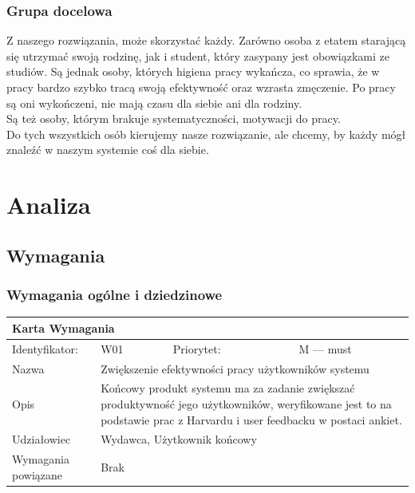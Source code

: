 \documentclass[a4paper,11pt]{report}
\begin{document}
\subsection {Grupa docelowa}
Z naszego rozwiązania, może skorzystać każdy.
Zarówno osoba z etatem starającą się utrzymać swoją rodzinę, jak i student, który zasypany jest obowiązkami ze studiów.
Są jednak osoby, których higiena pracy wykańcza, co sprawia, że w pracy bardzo szybko tracą swoją efektywność oraz wzrasta zmęczenie.
Po pracy są oni wykończeni, nie mają czasu dla siebie ani dla rodziny.\\
Są też osoby, którym brakuje systematyczności, motywacji do pracy.\\
Do tych wszystkich osób kierujemy nasze rozwiązanie, ale chcemy, by każdy mógł znaleźć w naszym systemie coś dla siebie.\\
\chapter {Analiza}
\section {Wymagania}
\subsection {Wymagania ogólne i dziedzinowe}
		\begin{tabular}{|p{3cm}|p{2cm}|p{2cm}|p{6cm}|}
		\hline
		\multicolumn{4}{|p{12 cm}|}{Karta Wymagania}\\
		\hline
		Identyfikator: & W01 & Priorytet: & M — must\\
		\hline
		Nazwa & \multicolumn{3}{|p{10 cm}|}{Zwiększenie efektywności pracy użytkowników systemu}\\
		\hline
		Opis & \multicolumn{3}{|p{10 cm}|}{Końcowy produkt systemu ma za zadanie zwiększać produktywność jego użytkowników, weryfikowane jest to na podstawie prac z Harvardu i user feedbacku w postaci ankiet.}\\
		\hline
		Udziałowiec & \multicolumn{3}{|p{10 cm}|}{Wydawca, Użytkownik końcowy}\\
		\hline
		Wymagania powiązane & \multicolumn{3}{|p{10 cm}|}{Brak}\\
		\hline
		\end{tabular}\\
\end{document}

